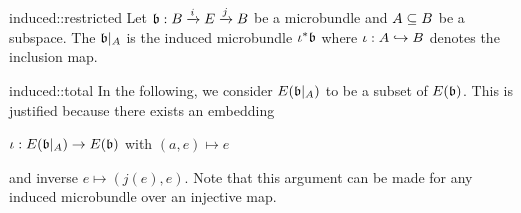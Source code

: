 \begin{myexample}{induced::restricted}    
    Let $\bb: \bundle{B}{E}{i}{j}$ be a microbundle and $A \sub B$ be a subspace.
    The  $\bb\restr{A}$ is the induced microbundle $\iota^*\bb$ where $\iota: A \incl B$ denotes the inclusion map.
\end{myexample}

\begin{myremark}{induced::total}
    In the following, we consider $E(\bb\restr{A})$ to be a subset of $E(\bb)$.
    This is justified because there exists an embedding
    \begin{center}
        $\iota: E(\bb\restr{A}) \to E(\bb)$ with $(a, e) \mapsto e$
    \end{center}
    and inverse $e \mapsto (j(e), e)$.
    Note that this argument can be made for any induced microbundle over an injective map.
\end{myremark}